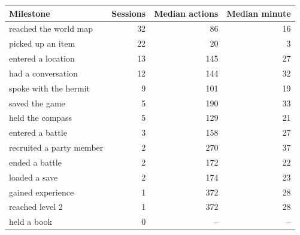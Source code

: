 \begin{tabular}{@{}lrrr@{}}
\toprule
Milestone & Sessions & Median actions & Median minute \\
\midrule
reached the world map & 32 & 86 & 16 \\
picked up an item & 22 & 20 & 3 \\
entered a location & 13 & 145 & 27 \\
had a conversation & 12 & 144 & 32 \\
spoke with the hermit & 9 & 101 & 19 \\
saved the game & 5 & 190 & 33 \\
held the compass & 5 & 129 & 21 \\
entered a battle & 3 & 158 & 27 \\
recruited a party member & 2 & 270 & 37 \\
ended a battle & 2 & 172 & 22 \\
loaded a save & 2 & 174 & 23 \\
gained experience & 1 & 372 & 28 \\
reached level 2 & 1 & 372 & 28 \\
held a book & 0 & -- & -- \\
\bottomrule
\end{tabular}

